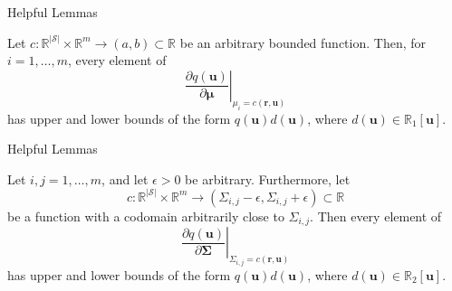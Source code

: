 \documentclass{beamer}
\begin{document}
\begin{frame}{Helpful Lemmas}
  \begin{lemma}
    Let $c : \mathbb{R}^{|\mathcal{S}|} \times \mathbb{R}^m \to (a, b) \subset
    \mathbb{R}$ be an arbitrary bounded function. Then, for $i = 1, \dots, m$,
    every element of
    \[
      \left. \frac{\partial q(\mathbf{u})}{\partial \bm\mu} \right|_{\mu_i =
        c(\mathbf{r}, \mathbf{u})}
    \]
    has upper and lower bounds of the form $q(\mathbf{u})d(\mathbf{u})$,
    where $d(\mathbf{u}) \in \mathbb{R}_1[\mathbf{u}]$.
  \end{lemma}
\end{frame}

\begin{frame}{Helpful Lemmas}
  \begin{lemma} \label{lemma:bound3}
    Let $i, j = 1, \dots, m$, and let $\epsilon > 0$ be arbitrary. Furthermore,
    let
    \[
      c : \mathbb{R}^{|\mathcal{S}|} \times \mathbb{R}^m \to (\Sigma_{i,j} - \epsilon,
      \Sigma_{i,j} + \epsilon) \subset \mathbb{R}
    \]
    be a function with a codomain arbitrarily close to $\Sigma_{i,j}$. Then every
    element of
    \[
      \left. \frac{\partial q(\mathbf{u})}{\partial \bm\Sigma} \right|_{\Sigma_{i,j} =
        c(\mathbf{r}, \mathbf{u})}
    \]
    has upper and lower bounds of the form $q(\mathbf{u})d(\mathbf{u})$, where
    $d(\mathbf{u}) \in \mathbb{R}_2[\mathbf{u}]$.
  \end{lemma}
\end{frame}
\end{document}
